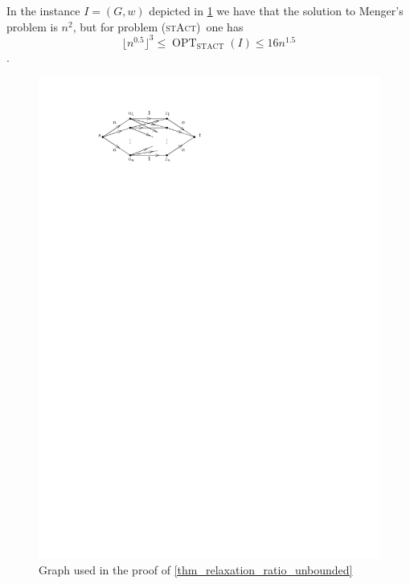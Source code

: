 \documentclass[runningheads]{llncs}
\numberwithin{equation}{section}
\newcommand{\stact}{\textsc{(stAct)}}
\DeclareMathOperator{\opt}{OPT}
\newcommand{\optDirStAct}{\opt_\text{STACT}}
\begin{document}
\begin{theorem}
\label{thm_relaxation_ratio_unbounded}
In the instance $I = (G, w)$ depicted in \cref{fig_relaxation_ratio_unbounded} we have that the solution to Menger's problem is $n^2$, but for problem \stact\ one has
\[ \lfloor n^{0.5} \rfloor^3 \leq \optDirStAct(I)\leq  16 n^{1.5}\].
\end{theorem}
\begin{figure}[htpb]
\centering
\includegraphics[scale=1]{img/relaxation-ratio-unbounded}
\caption{Graph used in the proof of \cref{thm_relaxation_ratio_unbounded}}
\label{fig_relaxation_ratio_unbounded}
\end{figure}
\end{document}
